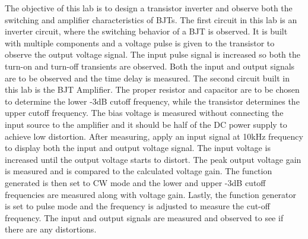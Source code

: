 The objective of this lab is to design a transistor inverter and observe both the switching and amplifier characteristics of BJTs. The first circuit in this lab is an inverter circuit, where the switching behavior of a BJT is observed. It is built with multiple components and a voltage pulse is given to the transistor to observe the output voltage signal. The input pulse signal is increased so both the turn-on and turn-off transients are observed. Both the input and output signals are to be observed and the time delay is measured. The second circuit built in this lab is the BJT Amplifier. The proper resistor and capacitor are to be chosen to determine the lower -3dB cutoff frequency, while the transistor determines the upper cutoff frequency. The bias voltage is measured without connecting the input source to the amplifier and it should be half of the DC power supply to achieve low distortion. After measuring, apply an input signal at 10kHz frequency to display both the input and output voltage signal. The input voltage is increased until the output voltage starts to distort. The peak output voltage gain is measured and is compared to the calculated voltage gain. The function generated is then set to CW mode and the lower and upper -3dB cutoff frequencies are measured along with voltage gain. Lastly, the function generator is set to pulse mode and the frequency is adjusted to measure the cut-off frequency. The input and output signals are measured and observed to see if there are any distortions. \\